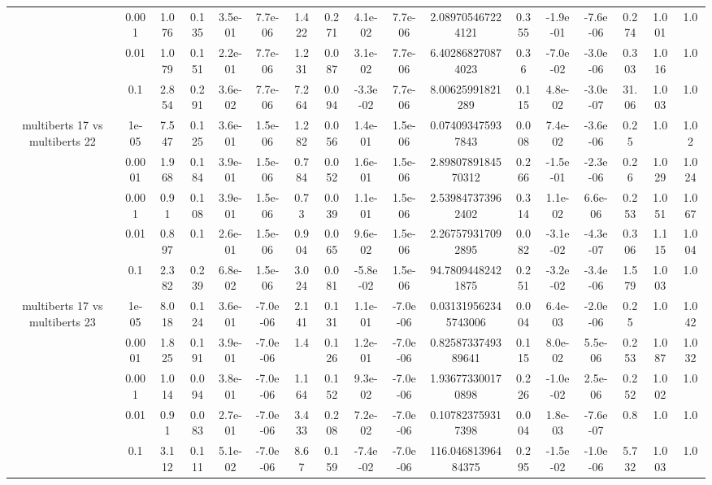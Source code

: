 \begin{tabular}{|c|c|c|c|c|c|c|c|c|c|c|c|c|c|c|c|c|}
 & 0.001 & 1.076 & 0.135 & 3.5e-01 & 7.7e-06 & 1.422 & 0.271 & 4.1e-02 & 7.7e-06 & 2.089705467224121 & 0.355 & -1.9e-01 & -7.6e-06 & 0.274 & 1.001 & 1.0 \\
 & 0.01 & 1.079 & 0.151 & 2.2e-01 & 7.7e-06 & 1.231 & 0.087 & 3.1e-02 & 7.7e-06 & 6.402868270874023 & 0.36 & -7.0e-02 & -3.0e-06 & 0.303 & 1.016 & 1.0 \\
 & 0.1 & 2.854 & 0.291 & 3.6e-02 & 7.7e-06 & 7.264 & 0.094 & -3.3e-02 & 7.7e-06 & 8.00625991821289 & 0.115 & 4.8e-02 & -3.0e-07 & 31.06 & 1.003 & 1.0 \\
\hline
\multirow{5}{*}{multiberts 17 vs multiberts 22} & 1e-05 & 7.547 & 0.125 & 3.6e-01 & 1.5e-06 & 1.282 & 0.056 & 1.4e-01 & 1.5e-06 & 0.074093475937843 & 0.008 & 7.4e-02 & -3.6e-06 & 0.25 & 1.0 & 1.02 \\
 & 0.0001 & 1.968 & 0.184 & 3.9e-01 & 1.5e-06 & 0.784 & 0.052 & 1.6e-01 & 1.5e-06 & 2.8980789184570312 & 0.266 & -1.5e-01 & -2.3e-06 & 0.26 & 1.029 & 1.024 \\
 & 0.001 & 0.91 & 0.108 & 3.9e-01 & 1.5e-06 & 0.73 & 0.039 & 1.1e-01 & 1.5e-06 & 2.539847373962402 & 0.314 & 1.1e-02 & 6.6e-06 & 0.253 & 1.051 & 1.067 \\
 & 0.01 & 0.897 & 0.1 & 2.6e-01 & 1.5e-06 & 0.904 & 0.065 & 9.6e-02 & 1.5e-06 & 2.267579317092895 & 0.082 & -3.1e-02 & -4.3e-07 & 0.306 & 1.115 & 1.004 \\
 & 0.1 & 2.382 & 0.239 & 6.8e-02 & 1.5e-06 & 3.024 & 0.081 & -5.8e-02 & 1.5e-06 & 94.78094482421875 & 0.251 & -3.2e-02 & -3.4e-06 & 1.579 & 1.003 & 1.0 \\
\hline
\multirow{5}{*}{multiberts 17 vs multiberts 23} & 1e-05 & 8.018 & 0.124 & 3.6e-01 & -7.0e-06 & 2.141 & 0.131 & 1.1e-01 & -7.0e-06 & 0.031319562345743006 & 0.004 & 6.4e-03 & -2.0e-06 & 0.25 & 1.0 & 1.042 \\
 & 0.0001 & 1.825 & 0.191 & 3.9e-01 & -7.0e-06 & 1.4 & 0.126 & 1.2e-01 & -7.0e-06 & 0.8258733749389641 & 0.115 & 8.0e-02 & 5.5e-06 & 0.253 & 1.087 & 1.032 \\
 & 0.001 & 1.014 & 0.094 & 3.8e-01 & -7.0e-06 & 1.164 & 0.152 & 9.3e-02 & -7.0e-06 & 1.936773300170898 & 0.226 & -1.0e-02 & 2.5e-06 & 0.252 & 1.002 & 1.0 \\
 & 0.01 & 0.91 & 0.083 & 2.7e-01 & -7.0e-06 & 3.433 & 0.208 & 7.2e-02 & -7.0e-06 & 0.107823759317398 & 0.004 & 1.8e-03 & -7.6e-07 & 0.8 & 1.0 & 1.0 \\
 & 0.1 & 3.112 & 0.111 & 5.1e-02 & -7.0e-06 & 8.67 & 0.159 & -7.4e-02 & -7.0e-06 & 116.04681396484375 & 0.295 & -1.5e-02 & -1.0e-06 & 5.732 & 1.003 & 1.0 \\

\end{tabular}
